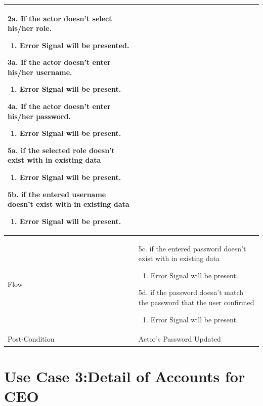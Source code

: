 \documentclass[12pt,a4paper]{article}
\begin{document}
\begin{longtable}{| p{3cm}|p{12cm}|}
2a. If the actor doesn't select his/her role.
 	\begin{enumerate}
		\item Error Signal will be presented.
	\end{enumerate}
3a. If the actor doesn't enter his/her username.
 	\begin{enumerate}
		\item Error Signal will be present.
	\end{enumerate}
4a. If the actor doesn't enter his/her password.
 	\begin{enumerate}
		\item Error Signal will be present.
	\end{enumerate}

5a. if the selected role doesn't exist with in existing data
	\begin{enumerate}
		\item Error Signal will be present.
	\end{enumerate}
5b. if the entered username doesn't exist with in existing data
	\begin{enumerate}
		\item Error Signal will be present.
	\end{enumerate}
\\ \hline
Flow & 5c. if the entered password doesn't exist with in existing data
	\begin{enumerate}
		\item Error Signal will be present.
	\end{enumerate}
	
5d. if the password doesn't match the password that the user confirmed
	\begin{enumerate}
		\item Error Signal will be present.
	\end{enumerate}
	
\\ \hline
Post-Condition & Actor's Password Updated   \\\hline
\end{longtable}

\section*{Use Case 3:Detail of Accounts for CEO }
\end{document}
